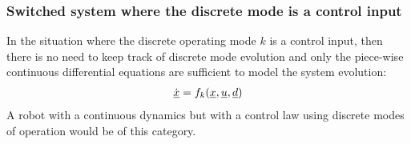\subsubsection{Switched system where the discrete mode is a control input}

In the situation where the discrete operating mode $k$ is a control input, then there is no need to keep track of discrete mode evolution and only the piece-wise continuous differential equations are sufficient to model the system evolution:
%
\begin{align}
	\dot{\underline{x}} = f_k( \underline{x} , \underline{u} , \underline{d} )
\end{align}
%
A robot with a continuous dynamics but with a control law using discrete modes of operation would be of this category.

